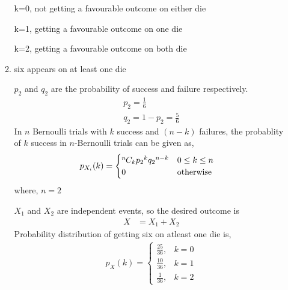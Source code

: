 \documentclass{article}
\newcommand*{\permcomb}[4][0mu]{{{}^{#3}\mkern#1#2_{#4}}}
\newcommand*{\comb}[1][-1mu]{\permcomb[#1]{C}}
\begin{document}
\begin{enumerate}[label=13.\arabic{enumi}.\arabic{enumii}]
\begin{enumerate}
k=0, not getting a favourable outcome on either die

k=1, getting a favourable outcome on one die

k=2, getting a favourable outcome on both die
\item six appears on at least one die

$p_2$ and $q_2$ are the probability of success and failure respectively.
\begin{align}
p_2 = \frac{1}{6}\\            
q_2 = 1 - p_2 = \frac{5}{6}      
\end{align}
In $n$ Bernoulli trials with $k$ success and $(n - k)$ failures, the probablity of $k$ success in $n$-Bernoulli trials can be given as,
\begin{align}
p_{X_i}(k)   &= 
\begin{cases}
\comb{n}{k}{p_2}^{k}{q_2}^{n-k} & 0 \le k \le n\\
0 & \text{otherwise}                
\end{cases}
\end{align}
where, $n = 2$

$X_1$ and $X_2$ are independent events, so the desired outcome is
\begin{align}
X&=X_1+X_2
\end{align}
Probability distribution of getting six on atleast one die is,
\begin{align}
  p_{X}(k) =
    \begin{cases}
      \frac{25}{36}, &  k = 0\\
      \frac{10}{36}, & k = 1\\
      \frac{1}{36}, & k = 2
    \end{cases}       
\end{align}
\end{enumerate}
\end{enumerate}
\end{document}
